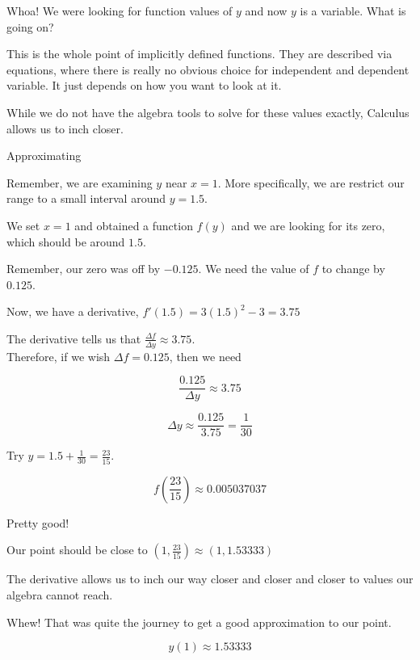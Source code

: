 \documentclass{ximera}
\begin{document}
Whoa!  We were looking for function values of $y$ and now $y$ is a variable.  What is going on?

This is the whole point of implicitly defined functions.  They are described via equations, where there is really no obvious choice for independent and dependent variable.  It just depends on how you want to look at it.




While we do not have the algebra tools to solve for these values exactly, Calculus allows us to inch closer.



\begin{explanation} Approximating


Remember, we are examining $y$ near $x = 1$.   More specifically, we are restrict our range to a small interval around $y = 1.5$.  

We set $x = 1$ and obtained a function $f(y)$ and we are looking for its zero, which should be around $1.5$.


Remember, our zero was off by $-0.125$.  We need the value of $f$ to change by $0.125$.


Now, we have a derivative, $f'(1.5) = 3 (1.5)^2 - 3 = 3.75$


The derivative tells us that $\frac{\Delta f}{\Delta y} \approx 3.75$. \\

Therefore, if we wish $\Delta f = 0.125$, then we need 



\[
\frac{0.125}{\Delta y} \approx 3.75
\]


\[
\Delta y \approx \frac{0.125}{3.75} = \frac{1}{30}
\]


Try $y = 1.5 + \frac{1}{30} = \frac{23}{15}$.


\[  f\left( \frac{23}{15} \right) \approx 0.005037037 \]


Pretty good!


Our point should be close to $\left(1, \frac{23}{15} \right) \approx (1, 1.53333)$


The derivative allows us to inch our way closer and closer and closer to values our algebra cannot reach.

\end{explanation}



Whew!  That was quite the journey to get a good approximation to our point.

\[ y(1) \approx 1.53333   \]
\end{document}
